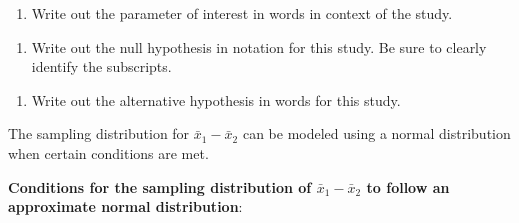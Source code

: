 \documentclass[
]{report}
\providecommand{\tightlist}{%
  \setlength{\itemsep}{0pt}\setlength{\parskip}{0pt}}
\begin{document}
\begin{enumerate}
\def\labelenumi{\arabic{enumi}.}
\tightlist
\item
  Write out the parameter of interest in words in context of the study.
\end{enumerate}

\vspace{1in}

\begin{enumerate}
\def\labelenumi{\arabic{enumi}.}
\setcounter{enumi}{1}
\tightlist
\item
  Write out the null hypothesis in notation for this study. Be sure to clearly identify the subscripts.
\end{enumerate}

\vspace{0.4in}

\begin{enumerate}
\def\labelenumi{\arabic{enumi}.}
\setcounter{enumi}{2}
\tightlist
\item
  Write out the alternative hypothesis in words for this study.
\end{enumerate}

\vspace{0.8in}

The sampling distribution for \(\bar{x}_1-\bar{x}_2\) can be modeled using a normal distribution when certain conditions are met.

\textbf{Conditions for the sampling distribution of \(\bar{x}_1 - \bar{x}_2\) to follow an approximate normal distribution}:
\end{document}
